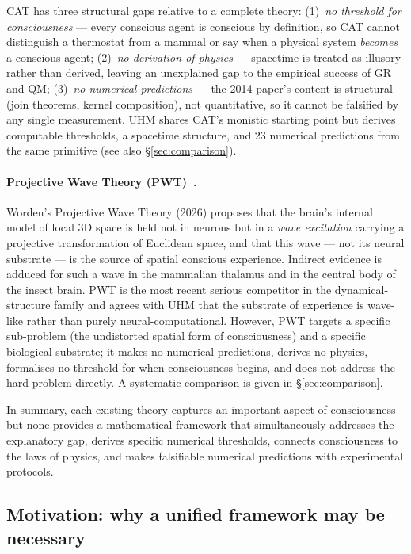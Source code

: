 CAT has three structural gaps relative to a complete theory:
(1)~\emph{no threshold for consciousness} --- every conscious agent is
conscious by definition, so CAT cannot distinguish a thermostat from a mammal
or say when a physical system \emph{becomes} a conscious agent;
(2)~\emph{no derivation of physics} --- spacetime is treated as illusory rather
than derived, leaving an unexplained gap to the empirical success of GR and QM;
(3)~\emph{no numerical predictions} --- the 2014 paper's content is structural
(join theorems, kernel composition), not quantitative, so it cannot be
falsified by any single measurement. UHM shares CAT's monistic starting point
but derives computable thresholds, a spacetime structure, and 23 numerical
predictions from the same primitive (see also \S\ref{sec:comparison}).

\paragraph{Projective Wave Theory (PWT)~\cite{worden2026}.}
Worden's Projective Wave Theory (2026) proposes that the brain's internal
model of local 3D space is held not in neurons but in a \emph{wave
excitation} carrying a projective transformation of Euclidean space, and that
this wave --- not its neural substrate --- is the source of spatial
conscious experience. Indirect evidence is adduced for such a wave in the
mammalian thalamus and in the central body of the insect brain. PWT is the
most recent serious competitor in the dynamical-structure family and agrees
with UHM that the substrate of experience is wave-like rather than
purely neural-computational. However, PWT targets a specific sub-problem
(the undistorted spatial form of consciousness) and a specific biological
substrate; it makes no numerical predictions, derives no physics,
formalises no threshold for when consciousness begins, and does not address
the hard problem directly. A systematic comparison is given in
\S\ref{sec:comparison}.

\medskip
In summary, each existing theory captures an important aspect of consciousness but none
provides a mathematical framework that simultaneously addresses the explanatory gap,
derives specific numerical thresholds, connects consciousness to the laws of physics,
and makes falsifiable numerical predictions with experimental protocols.

\subsection{Motivation: why a unified framework may be necessary}

